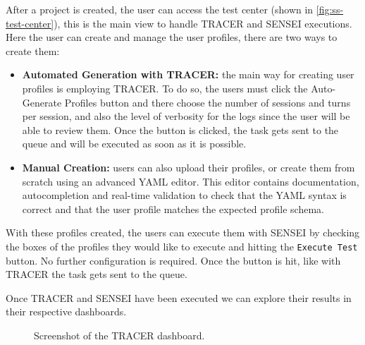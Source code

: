 After a project is created,
the user can access the test center
(shown in \autoref{fig:ss-test-center}),
this is the main view to handle \ac{TRACER} and SENSEI executions.
Here the user can create and manage the user profiles,
there are two ways to create them:
\begin{itemize}
  \item \textbf{Automated Generation with \ac{TRACER}:}
    the main way for creating user profiles is employing \ac{TRACER}.
    To do so, the users must click the Auto-Generate Profiles button
    and there choose the number of sessions and turns per session,
    and also the level of verbosity for the logs
    since the user will be able to review them.
    Once the button is clicked, the task gets sent to the queue
    and will be executed as soon as it is possible.
  \item \textbf{Manual Creation:}
    users can also upload their profiles,
    or create them from scratch using an advanced YAML editor.
    This editor contains documentation, autocompletion
    and real-time validation to check that the YAML syntax is correct
    and that the user profile matches the expected profile schema.
\end{itemize}

With these profiles created,
the users can execute them with SENSEI
by checking the boxes of the profiles they would like to execute
and hitting the \texttt{Execute Test} button.
No further configuration is required.
Once the button is hit, like with \ac{TRACER}
the task gets sent to the queue.

Once \ac{TRACER} and SENSEI have been executed
we can explore their results in their respective dashboards.

\begin{figure}[htpb]
  \centering
  \caption{Screenshot of the TRACER dashboard.}
  \label{fig:ss-tracer-dashboard}
\end{figure}



